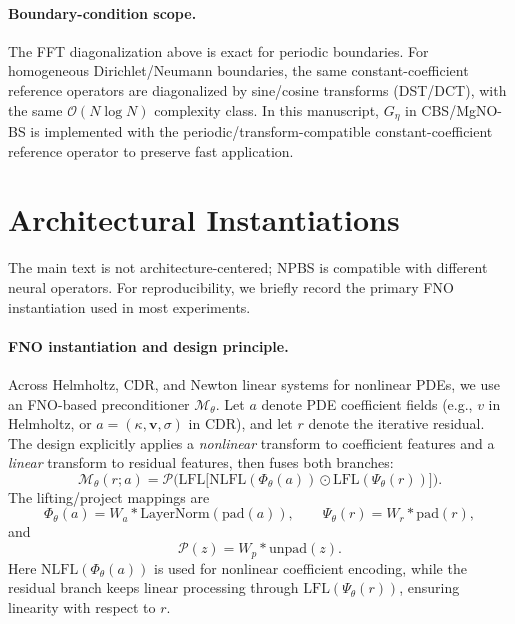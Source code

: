 \documentclass{article}
\theoremstyle{plain}
\theoremstyle{remark}
\begin{document}
\paragraph{Boundary-condition scope.}
The FFT diagonalization above is exact for periodic boundaries. For homogeneous Dirichlet/Neumann boundaries, the same constant-coefficient reference operators are diagonalized by sine/cosine transforms (DST/DCT), with the same $\mathcal{O}(N\log N)$ complexity class. In this manuscript, $G_\eta$ in CBS/MgNO-BS is implemented with the periodic/transform-compatible constant-coefficient reference operator to preserve fast application.



\section{Architectural Instantiations}
\label{app:architectures}
The main text is not architecture-centered; NPBS is compatible with different neural operators. For reproducibility, we briefly record the primary FNO instantiation used in most experiments.

\paragraph{FNO instantiation and design principle.}
Across Helmholtz, CDR, and Newton linear systems for nonlinear PDEs, we use an FNO-based preconditioner $\mathcal{M}_\theta$. Let $a$ denote PDE coefficient fields (e.g., $v$ in Helmholtz, or $a=(\kappa,\mathbf{v},\sigma)$ in CDR), and let $r$ denote the iterative residual. The design explicitly applies a \emph{nonlinear} transform to coefficient features and a \emph{linear} transform to residual features, then fuses both branches:
\begin{equation}
\mathcal{M}_\theta(r;a)
=
\mathcal{P} \Big(
\mathrm{LFL} \Big[
\mathrm{NLFL}(\Phi_\theta(a))
\odot
\mathrm{LFL}(\Psi_\theta(r))
\Big]
\Big).
\label{eq:fno_impl}
\end{equation}
The lifting/project mappings are
\begin{equation}
\Phi_\theta(a) = W_a * \mathrm{LayerNorm}(\mathrm{pad}(a)),
\qquad
\Psi_\theta(r) = W_r * \mathrm{pad}(r),
\label{eq:fno_lift}
\end{equation}
and
\begin{equation}
\mathcal{P}(z) = W_p * \mathrm{unpad}(z).
\label{eq:fno_proj}
\end{equation}
Here $\mathrm{NLFL}(\Phi_\theta(a))$ is used for nonlinear coefficient encoding, while the residual branch keeps linear processing through $\mathrm{LFL}(\Psi_\theta(r))$, ensuring linearity with respect to $r$.
\end{document}
